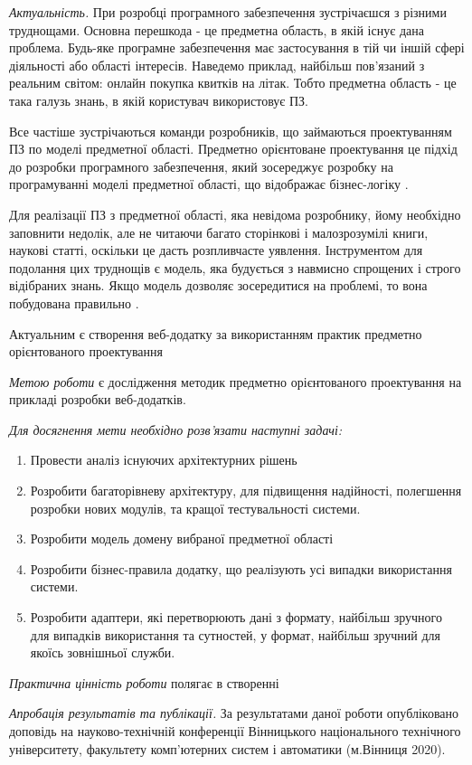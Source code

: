 
\emph{Актуальність.} При розробці програмного забезпечення зустрічаєшся з різними труднощами.
Основна перешкода - це предметна область, в якій існує дана проблема.
Будь-яке програмне забезпечення має застосування в тій чи іншій сфері діяльності або області
інтересів. Наведемо приклад, найбільш пов'язаний з реальним світом:
онлайн покупка квитків на літак. Тобто предметна область - це така галузь знань,
в якій користувач використовує ПЗ.

Все частіше зустрічаються команди розробників, що займаються проектуванням ПЗ по моделі
предметної області. Предметно орієнтоване проектування це підхід до розробки програмного
забезпечення, який зосереджує розробку на програмуванні моделі предметної області, що відображає
бізнес-логіку \cite{ddd-article}.

Для реалізації ПЗ з предметної області, яка невідома розробнику, йому необхідно заповнити
недолік, але не читаючи багато сторінкові і малозрозумілі книги, наукові статті, оскільки
це дасть розпливчасте уявлення. Інструментом для подолання цих труднощів є модель, яка
будується з навмисно спрощених і строго відібраних знань. Якщо модель дозволяє зосередитися
на проблемі, то вона побудована правильно \cite{ddd-evans}.

Актуальним є створення веб-додатку за використанням практик предметно орієнтованого
проектування

\emph{Метою роботи} є дослідження методик предметно орієнтованого проектування
на прикладі розробки веб-додатків.

\textit{Для досягнення мети необхідно розв'язати наступні задачі:}

\begin{enumerate}
  \item Провести аналіз існуючих архітектурних рішень
	\item Розробити багаторівневу архітектуру, для підвищення надійності,
		полегшення розробки нових модулів, та кращої тестувальності системи.
	\item Розробити модель домену вибраної предметної області
	\item Розробити бізнес-правила додатку, що реалізують усі випадки
		використання системи.
	\item Розробити адаптери, які перетворюють дані з формату,
		найбільш зручного для випадків використання та сутностей,
		у формат, найбільш зручний для якоїсь зовнішньої служби.
\end{enumerate}

\emph{Практична цінність роботи} полягає в створенні

\emph{Апробація результатів та публікації.} За результатами даної роботи
опубліковано доповідь \cite{thesis} на науково-технічній конференції
Вінницького національного технічного університету,
факультету комп'ютерних систем і автоматики (м.Вінниця 2020).

\clearpage
